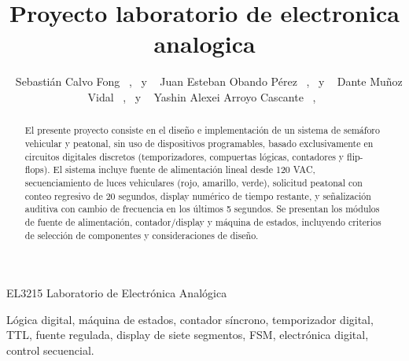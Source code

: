 \documentclass[journal]{IEEEtran}
\begin{document}
%
\title{Proyecto laboratorio de electronica analogica}


\author{~ Sebastián Calvo Fong ~,~
        y ~ Juan Esteban Obando Pérez ~,~
        y ~ Dante Muñoz Vidal ~,~
        y ~ Yashin Alexei Arroyo Cascante ~,~
}


%
{EL3215 Laboratorio de Electrónica Analógica}


\maketitle


\begin{abstract}
El presente proyecto consiste en el diseño e implementación de un sistema de semáforo vehicular y peatonal, sin uso de dispositivos programables, basado exclusivamente en circuitos digitales discretos (temporizadores, compuertas lógicas, contadores y flip-flops). El sistema incluye fuente de alimentación lineal desde 120 VAC, secuenciamiento de luces vehiculares (rojo, amarillo, verde), solicitud peatonal con conteo regresivo de 20 segundos, display numérico de tiempo restante, y señalización auditiva con cambio de frecuencia en los últimos 5 segundos. Se presentan los módulos de fuente de alimentación, contador/display y máquina de estados, incluyendo criterios de selección de componentes y consideraciones de diseño.
\end{abstract}

\begin{IEEEkeywords}
Lógica digital, máquina de estados, contador síncrono, temporizador digital, TTL, fuente regulada, display de siete segmentos, FSM, electrónica digital, control secuencial.
\end{IEEEkeywords}


\end{document}
